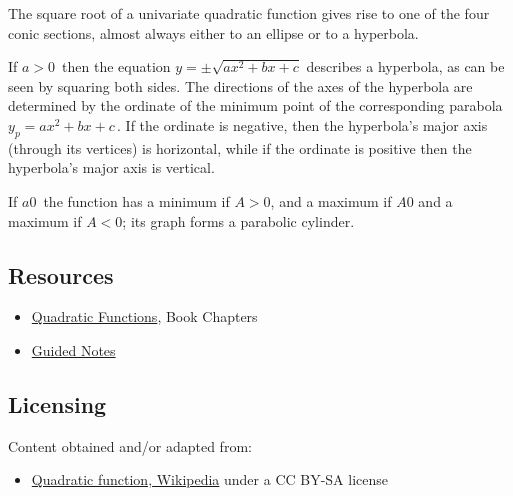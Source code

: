 The square root of a univariate quadratic function gives rise to one of the four conic
sections, almost always either to an ellipse or to a hyperbola.



If $a>0\,$ then the equation $y = \pm \sqrt{a x^2 + b x + c}$ describes a hyperbola, as
can be seen by squaring both sides. The directions of the axes of the hyperbola are
determined by the ordinate of the minimum point of the corresponding parabola $y _p = a
x^2 + b x + c \,$. If the ordinate is negative, then the hyperbola's major axis (through
its vertices) is horizontal, while if the ordinate is positive then the hyperbola's major
axis is vertical.



If $a0 \,$ the function has a minimum if $A>0$, and a maximum if $A0$ and a maximum if
$A<0$; its graph forms a parabolic cylinder.




\subsection{Resources}
\label{sss:reso-55b5}




\begin{itemize}
    \item \href{https://mathresearch.utsa.edu/wikiFiles/MAT1053/Quadratic_Functions/MAT1053_M2.2Quadratic_Functions.pdf}{Quadratic Functions}, Book Chapters
    \item \href{https://mathresearch.utsa.edu/wikiFiles/MAT1053/Quadratic_Functions/MAT1053_M2.2Quadratic_FunctionsGN.pdf}{Guided Notes}
\end{itemize}


\subsection{Licensing}
\label{sss:lice-7352}




Content obtained and/or adapted from:



\begin{itemize}
    \item \href{https://en.wikipedia.org/wiki/Quadratic_function}{Quadratic function, Wikipedia} under a CC BY-SA license
\end{itemize}


